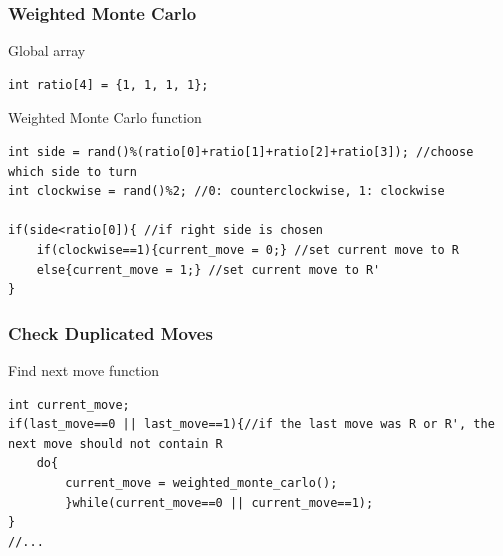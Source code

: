 \documentclass[aspectratio=169]{beamer}
\begin{document}
\begin{frame}[fragile]
\frametitle{Weighted Monte Carlo}

\begin{block}{Global array}
\begin{center}\begin{minipage}{0.95\textwidth}
    \begin{lstlisting} 
int ratio[4] = {1, 1, 1, 1};
    \end{lstlisting}
\end{minipage}\end{center}
\end{block}


\begin{block}{Weighted Monte Carlo function}
\begin{center}\begin{minipage}{0.95\textwidth}
\begin{lstlisting} 
int side = rand()%(ratio[0]+ratio[1]+ratio[2]+ratio[3]); //choose which side to turn
int clockwise = rand()%2; //0: counterclockwise, 1: clockwise

if(side<ratio[0]){ //if right side is chosen
    if(clockwise==1){current_move = 0;} //set current move to R
    else{current_move = 1;} //set current move to R'
}
\end{lstlisting}
\end{minipage}\end{center}
\end{block}
\end{frame}





\begin{frame}[fragile]
\frametitle{Check Duplicated Moves}
\begin{block}{Find next move function}
\begin{center}\begin{minipage}{0.95\textwidth}
    \begin{lstlisting} 
int current_move;
if(last_move==0 || last_move==1){//if the last move was R or R', the next move should not contain R
    do{
        current_move = weighted_monte_carlo();
        }while(current_move==0 || current_move==1);
}
//...
    \end{lstlisting}
\end{minipage}\end{center}
\end{block}
\end{frame}
\end{document}
